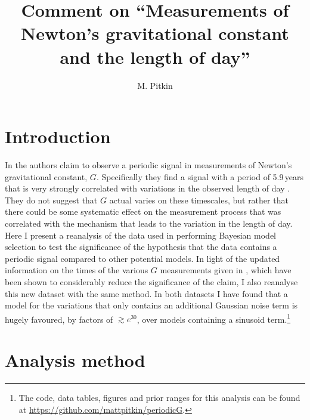 \documentclass[comment]{epl2}
\title{Comment on ``Measurements of Newton's gravitational constant and the length of day''}
\author{M. Pitkin}
\institute{
  SUPA, School of Physics \& Astronomy, University of Glasgow, Glasgow, G12 8QQ, UK
}
\begin{document}
\maketitle

\section{Introduction}

In \cite{2015EL....11010002A} the authors claim to observe a periodic signal in measurements of
Newton's gravitational constant, $G$. Specifically they find a signal with a period of 5.9\,years that
is very strongly correlated with variations in the observed length of day
\cite{2013Natur.499..202H}. They do not suggest that $G$ actual varies on these
timescales, but rather that there could be some systematic effect on the measurement process that was
correlated with the mechanism that leads to the variation in the length of day.
Here I present a reanalysis of the data used in \cite{2015EL....11010002A}
performing Bayesian model selection to test the significance of the hypothesis that the data contains
a periodic signal compared to other potential models. In light of the updated information on the times
of the various $G$ measurements given in \cite{2015arXiv150501774S}, which have been shown to considerably
reduce the significance of the claim, I also reanalyse this new dataset with
the same method. In both datasets I have found that a model for the variations that only contains an
additional Gaussian noise term is hugely favoured, by factors of $\gtrsim e^{30}$, over models containing
a sinusoid term.\footnote{The code, data tables, figures and prior ranges for this analysis can be
found at \url{https://github.com/mattpitkin/periodicG}.}

\section{Analysis method}
\end{document}

